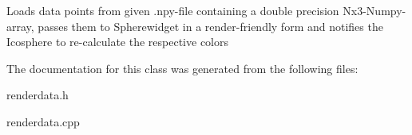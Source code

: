 Loads data points from given .npy-\/file containing a double precision Nx3-\/\+Numpy-\/array, passes them to Spherewidget in a render-\/friendly form and notifies the Icosphere to re-\/calculate the respective colors 

The documentation for this class was generated from the following files\+:\begin{DoxyCompactItemize}
\item 
renderdata.\+h\item 
renderdata.\+cpp\end{DoxyCompactItemize}

